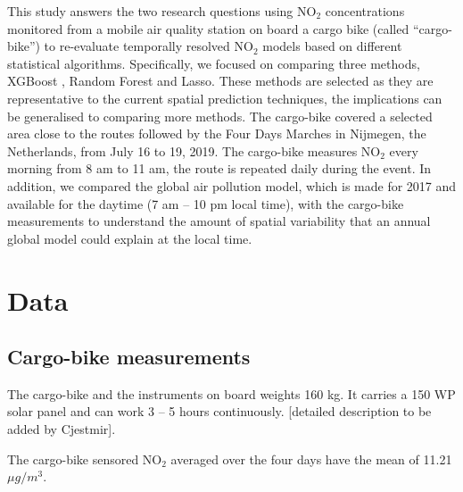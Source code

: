 \documentclass{article}
\begin{document}
This study answers the two research questions using NO$_2$ concentrations monitored from a mobile air quality station on board a cargo bike (called “cargo-bike”) to re-evaluate temporally resolved NO$_2$  models based on different statistical algorithms. Specifically, we focused on comparing three methods, XGBoost \citep[XGB,][]{xgboost}, Random Forest \citep[RF,][]{breiman2001random} and Lasso. These methods are selected as they are representative to the current spatial prediction techniques, the implications can be generalised to comparing more methods.   %
The cargo-bike covered a selected area close to the routes followed by the Four Days Marches in Nijmegen, the Netherlands, from July 16 to 19, 2019. The cargo-bike measures NO$_2$ every morning from 8 am to 11 am, the route is repeated daily during the event. In addition, we compared the global air pollution model, which is made for 2017 and available for the daytime  (7 am – 10 pm local time), with the cargo-bike measurements to understand the amount of spatial variability that an annual global model could explain at the local time.  

\section{Data }

\subsection{Cargo-bike measurements}
The cargo-bike and the instruments on board weights 160 kg. It carries a 150 WP solar panel and can work 3 – 5 hours continuously. [detailed description to be added by Cjestmir].

The cargo-bike sensored NO$_2$ averaged over the four days have the mean of 11.21 $\mu g/m^3$. 
\end{document}
